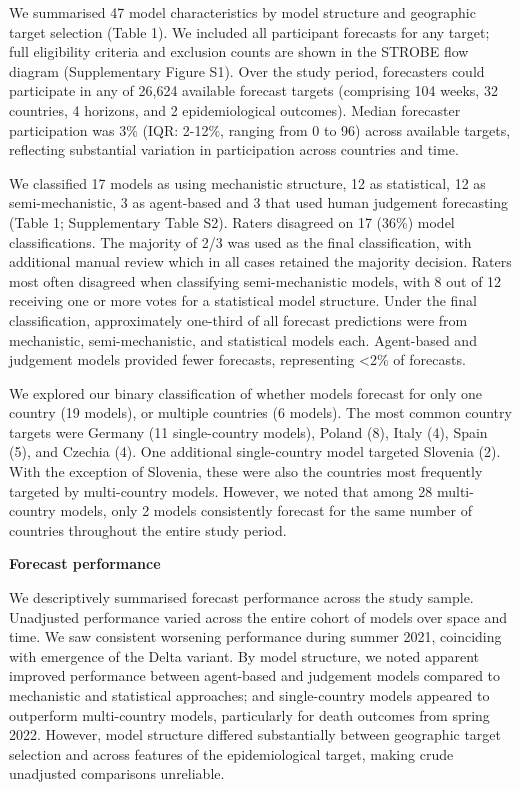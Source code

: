 \documentclass[
  letterpaper,
  DIV=11,
  numbers=noendperiod]{scrartcl}
\begin{document}
We summarised 47 model characteristics by model structure and geographic
target selection (Table 1). We included all participant forecasts for
any target; full eligibility criteria and exclusion counts are shown in
the STROBE flow diagram (Supplementary Figure S1). Over the study
period, forecasters could participate in any of 26,624 available
forecast targets (comprising 104 weeks, 32 countries, 4 horizons, and 2
epidemiological outcomes). Median forecaster participation was 3\% (IQR:
2-12\%, ranging from 0 to 96) across available targets, reflecting
substantial variation in participation across countries and time.

We classified 17 models as using mechanistic structure, 12 as
statistical, 12 as semi-mechanistic, 3 as agent-based and 3 that used
human judgement forecasting (Table 1; Supplementary Table S2). Raters
disagreed on 17 (36\%) model classifications. The majority of 2/3 was
used as the final classification, with additional manual review which in
all cases retained the majority decision. Raters most often disagreed
when classifying semi-mechanistic models, with 8 out of 12 receiving one
or more votes for a statistical model structure. Under the final
classification, approximately one-third of all forecast predictions were
from mechanistic, semi-mechanistic, and statistical models each.
Agent-based and judgement models provided fewer forecasts, representing
\textless2\% of forecasts.

We explored our binary classification of whether models forecast for
only one country (19 models), or multiple countries (6 models). The most
common country targets were Germany (11 single-country models), Poland
(8), Italy (4), Spain (5), and Czechia (4). One additional
single-country model targeted Slovenia (2). With the exception of
Slovenia, these were also the countries most frequently targeted by
multi-country models. However, we noted that among 28 multi-country
models, only 2 models consistently forecast for the same number of
countries throughout the entire study period.

\textbf{Forecast performance}

We descriptively summarised forecast performance across the study
sample. Unadjusted performance varied across the entire cohort of models
over space and time. We saw consistent worsening performance during
summer 2021, coinciding with emergence of the Delta variant. By model
structure, we noted apparent improved performance between agent-based
and judgement models compared to mechanistic and statistical approaches;
and single-country models appeared to outperform multi-country models,
particularly for death outcomes from spring 2022. However, model
structure differed substantially between geographic target selection and
across features of the epidemiological target, making crude unadjusted
comparisons unreliable.
\end{document}
